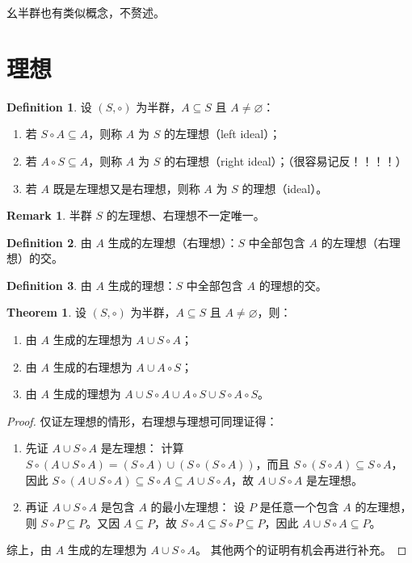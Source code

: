 \documentclass[oneside]{book}
\theoremstyle{definition}
\newtheorem{definition}{Definition}[section]
\newtheorem{theorem}{Theorem}[section]
\newtheorem{remark}{Remark}[section]
\begin{document}
幺半群也有类似概念，不赘述。
\section{理想}

\begin{definition}
	设 \( (S, \circ) \) 为半群，\( A \subseteq S \) 且 \( A \neq \varnothing \)：
	\begin{enumerate}
		\item 若 \( S \circ A \subseteq A \)，则称 \( A \) 为 \( S \) 的左理想（left ideal）；
		\item 若 \( A \circ S \subseteq A \)，则称 \( A \) 为 \( S \) 的右理想（right ideal）；（很容易记反！！！！）
		\item 若 \( A \) 既是左理想又是右理想，则称 \( A \) 为 \( S \) 的理想（ideal）。
	\end{enumerate}
\end{definition}

\begin{remark}
	半群 \( S \) 的左理想、右理想不一定唯一。
\end{remark}

\begin{definition}
	由 \( A \) 生成的左理想（右理想）：\( S \) 中全部包含 \( A \) 的左理想（右理想）的交。
\end{definition}

\begin{definition}
	由 \( A \) 生成的理想：\( S \) 中全部包含 \( A \) 的理想的交。
\end{definition}

\begin{theorem}
	设 \( (S, \circ) \) 为半群，\( A \subseteq S \) 且 \( A \neq \varnothing \)，则：
	\begin{enumerate}
		\item 由 \( A \) 生成的左理想为 \( A \cup S \circ A \)；
		\item 由 \( A \) 生成的右理想为 \( A \cup A \circ S \)；
		\item 由 \( A \) 生成的理想为 \( A \cup S \circ A \cup A \circ S \cup S \circ A \circ S \)。
	\end{enumerate}
\end{theorem}

\begin{proof}
	仅证左理想的情形，右理想与理想可同理证得：
	\begin{enumerate}
		\item 先证 \( A \cup S \circ A \) 是左理想：
		计算 \( S \circ (A \cup S \circ A) = (S \circ A) \cup (S \circ (S \circ A)) \)，而且 \( S \circ (S \circ A) \subseteq S \circ A \)，因此 \( S \circ (A \cup S \circ A) \subseteq S \circ A \subseteq A \cup S \circ A \)，故 \( A \cup S \circ A \) 是左理想。
		\item 再证 \( A \cup S \circ A \) 是包含 \( A \) 的最小左理想：
		设 \( P \) 是任意一个包含 \( A \) 的左理想，则 \( S \circ P \subseteq P \)。又因 \( A \subseteq P \)，故 \( S \circ A \subseteq S \circ P \subseteq P \)，因此 \( A \cup S \circ A \subseteq P \)。
	\end{enumerate}
	综上，由 \( A \) 生成的左理想为 \( A \cup S \circ A \)。
	其他两个的证明有机会再进行补充。
\end{proof}
\end{document}
